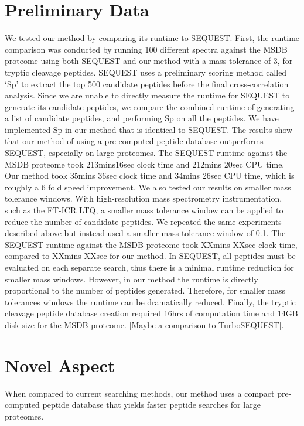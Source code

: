 \documentclass[12pt]{article}
\begin{document}
\section{Preliminary Data}
We tested our method by comparing
its runtime to SEQUEST. First, the runtime comparison was conducted by
running 100 different spectra against the MSDB proteome using both
SEQUEST and our method with a mass tolerance of 3, for tryptic cleavage
peptides. SEQUEST uses a preliminary scoring method called `Sp' to
extract the top 500 candidate peptides before the final cross-correlation
analysis. Since we are unable to directly measure the runtime for SEQUEST
to generate its candidate peptides, we compare the combined runtime
of generating a list of candidate peptides, and performing Sp on all
the peptides. We have implemented Sp in our method that is identical
to SEQUEST. The results show that our method of using a pre-computed
peptide database outperforms SEQUEST, especially on large proteomes. The
SEQUEST runtime against the MSDB proteome took 213mins16sec clock time
and 212mins 20sec CPU time. Our method took 35mins 36sec clock time and
34mins 26sec CPU time, which is roughly a 6 fold speed improvement.
We also tested our results on smaller mass tolerance windows. With
high-resolution mass spectrometry instrumentation, such as the FT-ICR
LTQ, a smaller mass tolerance window can be applied to reduce the number
of candidate peptides. We repeated the same experiments described
above but instead used a smaller mass tolerance window of 0.1. The
SEQUEST runtime against the MSDB proteome took XXmins XXsec clock time,
compared to XXmins XXsec for our method. In SEQUEST, all peptides must
be evaluated on each separate search, thus there is a minimal runtime
reduction for smaller mass windows. However, in our method the runtime is
directly proportional to the number of peptides generated. Therefore, for
smaller mass tolerances windows the runtime can be dramatically reduced.
Finally, the tryptic cleavage peptide database creation required 16hrs
of computation time and 14GB disk size for the MSDB proteome. [Maybe a
comparison to TurboSEQUEST].

\section{Novel Aspect}
When compared to current searching methods,
our method uses a compact pre-computed peptide database that yields
faster peptide searches for large proteomes.
\end{document}

